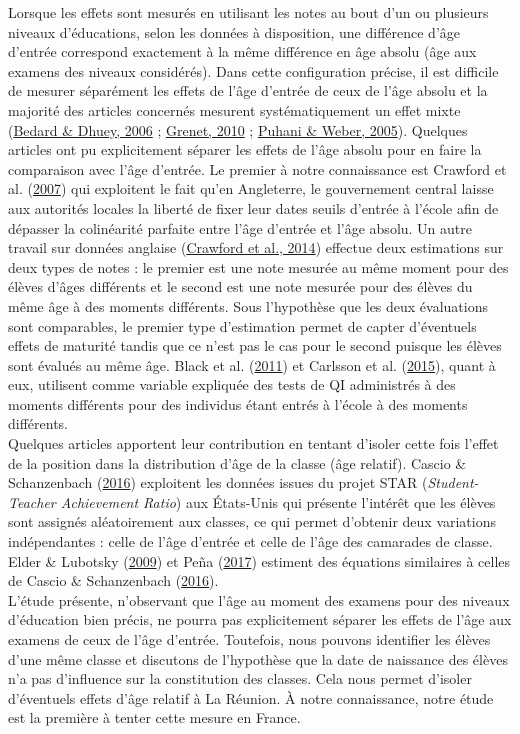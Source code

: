 \documentclass[
]{book}
\begin{document}
\quad Lorsque les effets sont mesurés en utilisant les notes au bout d'un ou plusieurs niveaux d'éducations, selon les données à disposition, une différence d'âge d'entrée correspond exactement à la même différence en âge absolu (âge aux examens des niveaux considérés). Dans cette configuration précise, il est difficile de mesurer séparément les effets de l'âge d'entrée de ceux de l'âge absolu et la majorité des articles concernés mesurent systématiquement un effet mixte (\protect\hyperlink{ref-BED:DHU:06}{Bedard \& Dhuey, 2006} ; \protect\hyperlink{ref-GRE:10}{Grenet, 2010} ; \protect\hyperlink{ref-PUH:WEB:05}{Puhani \& Weber, 2005}). Quelques articles ont pu explicitement séparer les effets de l'âge absolu pour en faire la comparaison avec l'âge d'entrée. Le premier à notre connaissance est Crawford et al. (\protect\hyperlink{ref-CRA:eal:07}{2007}) qui exploitent le fait qu'en Angleterre, le gouvernement central laisse aux autorités locales la liberté de fixer leur dates seuils d'entrée à l'école afin de dépasser la colinéarité parfaite entre l'âge d'entrée et l'âge absolu. Un autre travail sur données anglaise (\protect\hyperlink{ref-CRA:eal:14}{Crawford et al., 2014}) effectue deux estimations sur deux types de notes : le premier est une note mesurée au même moment pour des élèves d'âges différents et le second est une note mesurée pour des élèves du même âge à des moments différents. Sous l'hypothèse que les deux évaluations sont comparables, le premier type d'estimation permet de capter d'éventuels effets de maturité tandis que ce n'est pas le cas pour le second puisque les élèves sont évalués au même âge. Black et al. (\protect\hyperlink{ref-BLA:eal:11}{2011}) et Carlsson et al. (\protect\hyperlink{ref-CAR:eal:15}{2015}), quant à eux, utilisent comme variable expliquée des tests de QI administrés à des moments différents pour des individus étant entrés à l'école à des moments différents.\\
Quelques articles apportent leur contribution en tentant d'isoler cette fois l'effet de la position dans la distribution d'âge de la classe (âge relatif). Cascio \& Schanzenbach (\protect\hyperlink{ref-CAS:SCH:16}{2016}) exploitent les données issues du projet STAR (\emph{Student-Teacher Achievement Ratio}) aux États-Unis qui présente l'intérêt que les élèves sont assignés aléatoirement aux classes, ce qui permet d'obtenir deux variations indépendantes : celle de l'âge d'entrée et celle de l'âge des camarades de classe. Elder \& Lubotsky (\protect\hyperlink{ref-ELD:LUB:09}{2009}) et Peña (\protect\hyperlink{ref-PEN:17}{2017}) estiment des équations similaires à celles de Cascio \& Schanzenbach (\protect\hyperlink{ref-CAS:SCH:16}{2016}).\\
L'étude présente, n'observant que l'âge au moment des examens pour des niveaux d'éducation bien précis, ne pourra pas explicitement séparer les effets de l'âge aux examens de ceux de l'âge d'entrée. Toutefois, nous pouvons identifier les élèves d'une même classe et discutons de l'hypothèse que la date de naissance des élèves n'a pas d'influence sur la constitution des classes. Cela nous permet d'isoler d'éventuels effets d'âge relatif à La Réunion. À notre connaissance, notre étude est la première à tenter cette mesure en France.
\end{document}
